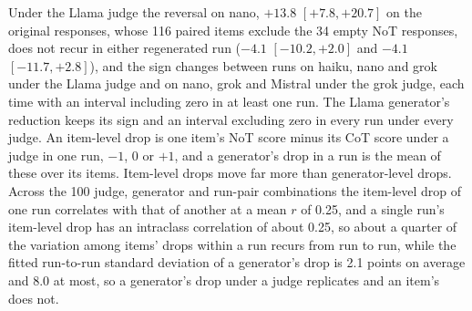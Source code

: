 Under the Llama judge the reversal on nano, $+13.8$ $[+7.8, +20.7]$ on the
original responses, whose 116 paired items exclude the 34 empty NoT
responses, does not recur in either regenerated run ($-4.1$ $[-10.2, +2.0]$ and
$-4.1$ $[-11.7, +2.8]$), and the sign changes between runs on haiku, nano and
grok under the Llama judge and on nano, grok and Mistral under the grok
judge, each time with an interval including zero in at least one run.
The Llama generator's reduction keeps its sign and an interval excluding zero
in every run under every judge.
An item-level drop is one item's NoT score minus its CoT score under a judge
in one run, $-1$, 0 or $+1$, and a generator's drop in a run is the mean of
these over its items.
Item-level drops move far more than generator-level drops. Across the 100
judge, generator and run-pair combinations the item-level drop of one run
correlates with that of another at a mean $r$ of 0.25, and a single run's
item-level drop has an intraclass correlation of about 0.25, so about a
quarter of the variation among items' drops within a run recurs from run to
run, while the fitted run-to-run standard deviation of a generator's drop is
2.1 points on average and 8.0 at most, so a generator's drop under a judge
replicates and an item's does not.

